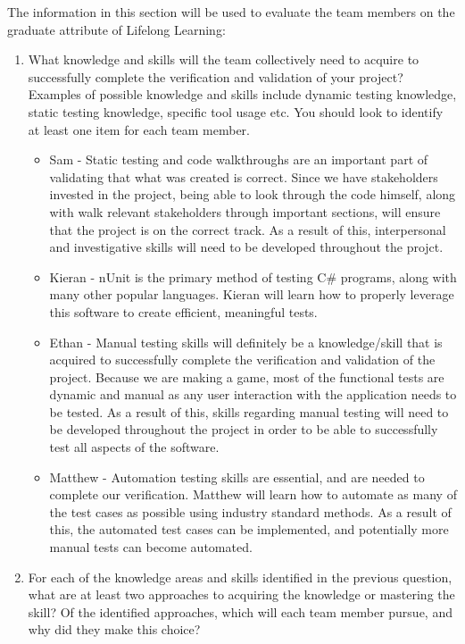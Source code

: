 \documentclass[12pt, titlepage]{article}
\begin{document}
The information in this section will be used to evaluate the team members on the
graduate attribute of Lifelong Learning:

\begin{enumerate}
  \item What knowledge and skills will the team collectively need to acquire to
  successfully complete the verification and validation of your project?
  Examples of possible knowledge and skills include dynamic testing knowledge,
  static testing knowledge, specific tool usage etc.  You should look to
  identify at least one item for each team member.


  \begin{itemize}
      \item Sam - Static testing and code walkthroughs are an important part of validating that what was created is correct. Since we have stakeholders invested in the project, being able to look through the code himself, along with walk relevant stakeholders through important sections, will ensure that the project is on the correct track. As a result of this, interpersonal and investigative skills will need to be developed throughout the projct. 
      \item Kieran - nUnit is the primary method of testing C\# programs, along with many other popular languages. Kieran will learn how to properly leverage this software to create efficient, meaningful tests. 
      \item Ethan - Manual testing skills will definitely be a knowledge/skill that is acquired to successfully complete the verification and validation of the project. Because we are making a game, most of the functional tests are dynamic and manual as any user interaction with the application needs to be tested. As a result of this, skills regarding manual testing will need to be developed throughout the project in order to be able to successfully test all aspects of the software.
      \item Matthew - Automation testing skills are essential, and are needed to complete our verification. Matthew will learn how to automate as many of the test cases as possible using industry standard methods. As a result of this, the automated test cases can be implemented, and potentially more manual tests can become automated. 

  \end{itemize}

  
  \item For each of the knowledge areas and skills identified in the previous
  question, what are at least two approaches to acquiring the knowledge or
  mastering the skill?  Of the identified approaches, which will each team
  member pursue, and why did they make this choice?


\end{enumerate}
\end{document}
